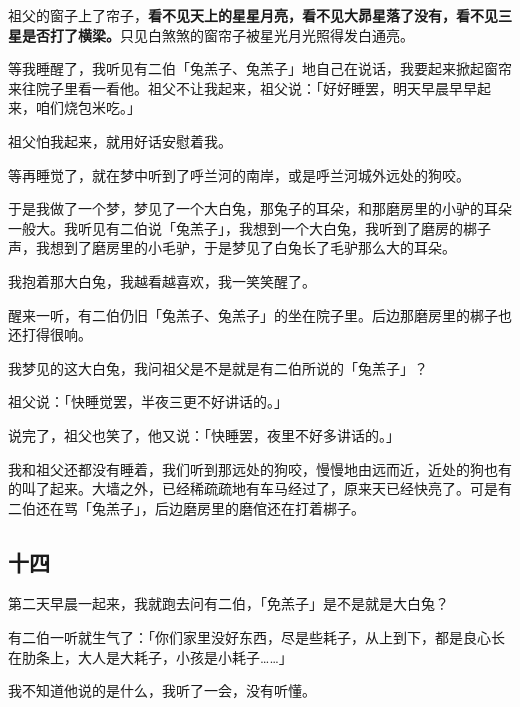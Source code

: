 \documentclass[UTF8]{ctexart}
\begin{document}
祖父的窗子上了帘子，\textbf{看不见天上的星星月亮，看不见大昴星落了没有，看不见三星是否打了横梁。}只见白煞煞的窗帘子被星光月光照得发白通亮。

等我睡醒了，我听见有二伯「兔羔子、兔羔子」地自己在说话，我要起来掀起窗帘来往院子里看一看他。祖父不让我起来，祖父说：「好好睡罢，明天早晨早早起来，咱们烧包米吃。」

祖父怕我起来，就用好话安慰着我。

等再睡觉了，就在梦中听到了呼兰河的南岸，或是呼兰河城外远处的狗咬。

于是我做了一个梦，梦见了一个大白兔，那兔子的耳朵，和那磨房里的小驴的耳朵一般大。我听见有二伯说「兔羔子」，我想到一个大白兔，我听到了磨房的梆子声，我想到了磨房里的小毛驴，于是梦见了白兔长了毛驴那么大的耳朵。

我抱着那大白兔，我越看越喜欢，我一笑笑醒了。

醒来一听，有二伯仍旧「兔羔子、兔羔子」的坐在院子里。后边那磨房里的梆子也还打得很响。

我梦见的这大白兔，我问祖父是不是就是有二伯所说的「兔羔子」？

祖父说：「快睡觉罢，半夜三更不好讲话的。」

说完了，祖父也笑了，他又说：「快睡罢，夜里不好多讲话的。」

我和祖父还都没有睡着，我们听到那远处的狗咬，慢慢地由远而近，近处的狗也有的叫了起来。大墙之外，已经稀疏疏地有车马经过了，原来天已经快亮了。可是有二伯还在骂「兔羔子」，后边磨房里的磨倌还在打着梆子。

\subsection{十四}

第二天早晨一起来，我就跑去问有二伯，「免羔子」是不是就是大白兔？

有二伯一听就生气了：「你们家里没好东西，尽是些耗子，从上到下，都是良心长在肋条上，大人是大耗子，小孩是小耗子……」

我不知道他说的是什么，我听了一会，没有听懂。
\end{document}
